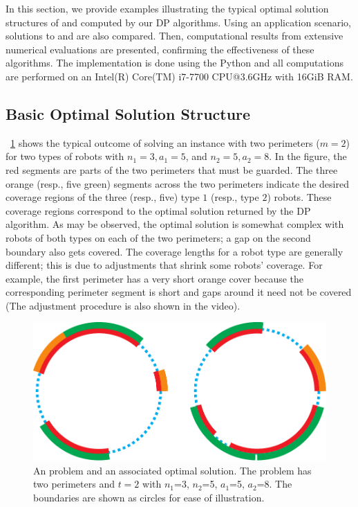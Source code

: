 In this section, we provide examples illustrating the typical 
optimal solution structures of \opglr and \opgmc computed by 
our DP algorithms. Using an application scenario, solutions to 
\opglr and \opgmc are also compared. Then, computational 
results from extensive numerical evaluations are presented, 
confirming the effectiveness of these algorithms. The 
implementation is done using the Python and all 
computations are performed on an Intel(R) Core(TM) i7-7700 CPU@3.6GHz 
with 16GiB RAM. 

\subsection{Basic Optimal Solution Structure}
~\ref{fig:opgext-opglrm} shows the typical outcome of solving an \opglr 
instance with two perimeters ($m = 2$) for two types of robots with 
$n_1 = 3, a_1 = 5$, and $n_2 = 5, a_2 = 8$. 
In the figure, the red segments are parts of the two perimeters that 
must be guarded. The three orange (resp., five green) segments across 
the two perimeters indicate the desired coverage regions of the three 
(resp., five) type $1$ (resp., type $2$) robots. These coverage regions 
correspond to the optimal solution returned by the DP algorithm. As 
may be observed, the optimal solution is somewhat complex with robots 
of both types on each of the two perimeters; a gap on the second boundary 
also gets covered. The coverage lengths for a robot type are generally 
different; this is due to adjustments that shrink some robots' coverage. 
For example, the first perimeter has a very short orange cover because 
the corresponding perimeter segment is short and gaps around it need 
not be covered (The adjustment procedure is also shown in the video). 
\begin{figure}[!ht]
    \centering
    \includegraphics[scale = 0.6]{chapters/opg-ext/figures/mopglr_shrink-new-eps-converted-to.pdf}
    \caption[An \opglr problem and an associated optimal solution]
    {An \opglr problem and an associated optimal solution. The 
		problem has two perimeters and $t = 2$ with $n_1$=3, $n_2$=5, 
		$a_1$=5, $a_2$=8. The boundaries are shown as circles for ease of 
		illustration.
		}
		\label{fig:opgext-opglrm}
\end{figure}


